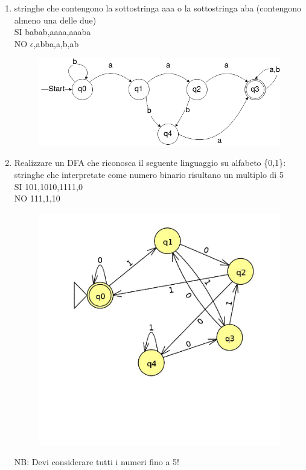 \documentclass[12pt]{article}
\begin{document}
\begin{enumerate}
\newpage
\item stringhe che contengono la sottostringa aaa o la sottostringa aba (contengono almeno una delle due)
\\ SI babab,aaaa,aaaba
\\ NO $\epsilon$,abba,a,b,ab

\begin{figure}[h]
  \includegraphics[scale = 0.5]{media/09_21_es5.png}
  \centering
\end{figure}

\item Realizzare un DFA che riconosca il seguente linguaggio su alfabeto \{0,1\}: stringhe che interpretate come numero binario risultano un multiplo di 5 
\\
SI 101,1010,1111,0
\\
NO 111,1,10

\begin{figure}[h]
  \includegraphics[scale = 0.25]{media/09_21_es6.jpg}
  \centering
\end{figure}
NB: Devi considerare tutti i numeri fino a 5!


\end{enumerate}
\end{document}
